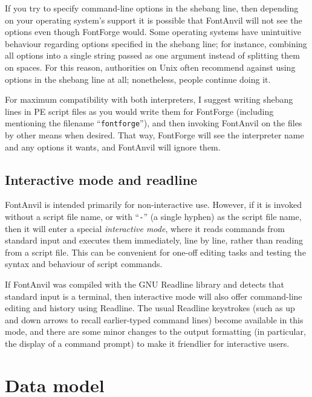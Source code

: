 \documentclass[11pt]{report}
\begin{document}
If you try to specify command-line options in the shebang line, then
depending on your operating system's support it is possible that FontAnvil
will not see the options even though FontForge would.  Some operating
systems have unintuitive behaviour regarding options specified in the
shebang line; for instance, combining all options into a single string
passed as one argument instead of splitting them on spaces.  For this
reason, authorities on Unix often recommend against using options in the
shebang line at all; nonetheless, people continue doing it.

For maximum compatibility with both interpreters, I suggest writing shebang
lines in PE script files as you would write them for FontForge (including
mentioning the filename ``\texttt{fontforge}''), and then invoking FontAnvil
on the files by other means when desired.  That way, FontForge will see the
interpreter name and any options it wants, and FontAnvil will ignore them.

\section{Interactive mode and readline}

FontAnvil is intended primarily for non-interactive use.  However, if it is
invoked without a script file name, or with ``\texttt{-}'' (a single hyphen)
as the script file name, then it will enter a special \emph{interactive
mode}, where it reads commands from standard input and executes them
immediately, line by line, rather than reading from a script file.  This can
be convenient for one-off editing tasks and testing the syntax and behaviour
of script commands.

If FontAnvil was compiled with the GNU Readline library and detects that
standard input is a terminal, then interactive mode will also offer
command-line editing and history using Readline.  The usual Readline
keystrokes (such as up and down arrows to recall earlier-typed command
lines) become available in this mode, and there are some minor changes to
the output formatting (in particular, the display of a command prompt) to
make it friendlier for interactive users.


\chapter{Data model}
\label{sec:data-model}
\end{document}
